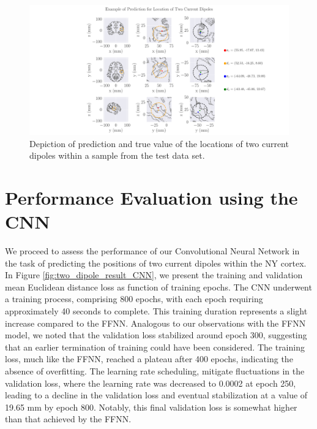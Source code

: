 \documentclass[a4paper, UKenglish, 11pt]{uiomaster}
\begin{document}
\begin{figure}[!htb]
  \hspace*{-4.5cm}
    \centering
    \includegraphics[width=20cm]{figures/NN_two_dipole/two_dipoles_prediction.pdf}
    \caption{Depiction of prediction and true value of the locations of two current dipoles within a sample from the test data set.}
    \label{fig:two_dipole_result}
\end{figure}

\FloatBarrier


\section{Performance Evaluation using the CNN}
We proceed to assess the performance of our Convolutional Neural Network in the task of predicting the positions of two current dipoles within the NY cortex. In Figure \ref{fig:two_dipole_result_CNN}, we present the training and validation mean Euclidean distance loss as function of training epochs. The CNN underwent a training process, comprising 800 epochs, with each epoch requiring approximately 40 seconds to complete. This training duration represents a slight increase compared to the FFNN. Analogous to our observations with the FFNN model, we noted that the validation loss stabilized around epoch 300, suggesting that an earlier termination of training could have been considered. The training loss, much like the FFNN, reached a plateau after 400 epochs, indicating the absence of overfitting. The learning rate scheduling, mitigate fluctuations in the validation loss, where the learning rate was decreased to 0.0002 at epoch 250, leading to a decline in the validation loss and eventual stabilization at a value of 19.65 mm by epoch 800. Notably, this final validation loss is somewhat higher than that achieved by the FFNN.
\end{document}
